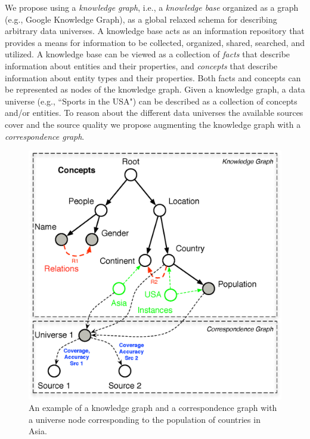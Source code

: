 \documentclass{sig-alternate}
\begin{document}
We propose using a {\em knowledge graph}, i.e., a {\em knowledge base} organized as a graph (e.g., Google Knowledge Graph), as a global relaxed schema for describing arbitrary data universes. A knowledge base acts as an information repository that provides a means for information to be collected, organized, shared, searched, and utilized. A knowledge base can be viewed as a collection of {\em facts} that describe information about entities and their properties, and {\em concepts} that describe information about entity types and their properties. Both facts and concepts can be represented as nodes of the knowledge graph. Given a knowledge graph, a data universe (e.g., ``Sports in the USA") can be described as a collection of concepts and/or entities. To reason about the different data universes the available sources cover and the source quality we propose augmenting the knowledge graph with a {\em correspondence graph}.

\begin{figure}
	\begin{center}
	\includegraphics[clip,scale=0.4]{fig/kgcg}
	\caption{An example of a knowledge graph and a correspondence graph with a universe node corresponding to the population of countries in Asia.}
	\label{fig:kgcg}
	\end{center}
	\vspace{-20pt}
\end{figure}
\end{document}
